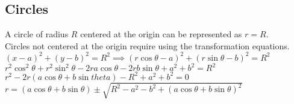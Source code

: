 \subsection{Circles}
\noindent
A circle of radius $R$ centered at the origin can be represented as $r = R$.\\
Circles not centered at the origin require using the transformation equations.
\indent
$(x-a)^2 + (y-b)^2 = R^2 \implies (r\cos{\theta}-a)^2 + (r\sin{\theta}-b)^2 = R^2$\\
\indent
$r^2\cos^{2}{\theta} + r^2\sin^{2}{\theta} - 2ra\cos{\theta} - 2rb\sin{\theta} + a^2 + b^2 = R^2$\\
\indent
$r^2 - 2r(a\cos{\theta} + b\sin{theta}) - R^2 + a^2 + b^2 = 0$\\
\indent
$r = (a\cos{\theta} + b\sin{\theta}) \pm \sqrt{R^2 - a^2 - b^2 + (a\cos{\theta} + b\sin{\theta})^2}$\\
